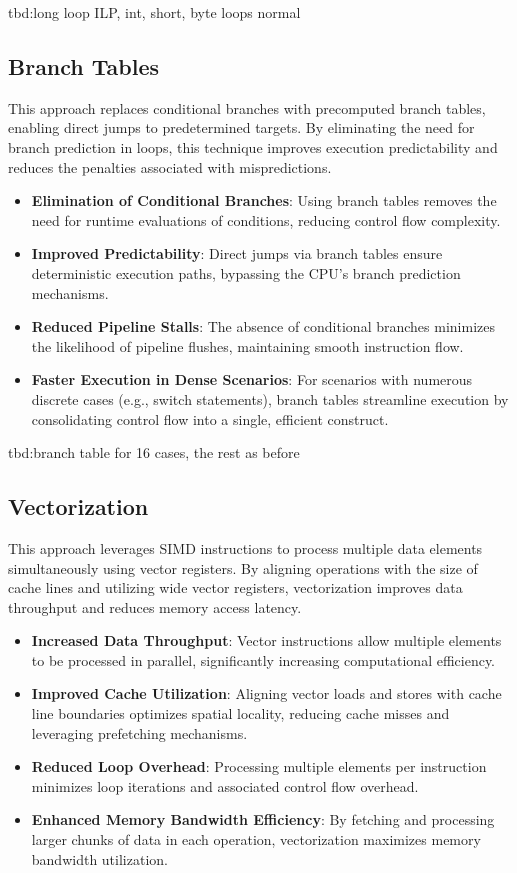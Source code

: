 \documentclass{article}
\begin{document}
tbd:long loop ILP, int, short, byte loops normal

\subsection{Branch Tables}

This approach replaces conditional branches with precomputed branch tables, enabling direct jumps to predetermined targets. By eliminating the need for branch prediction in loops, this technique improves execution predictability and reduces the penalties associated with mispredictions.

\begin{itemize}
  \item \textbf{Elimination of Conditional Branches}: Using branch tables removes the need for runtime evaluations of conditions, reducing control flow complexity.
  \item \textbf{Improved Predictability}: Direct jumps via branch tables ensure deterministic execution paths, bypassing the CPU's branch prediction mechanisms.
  \item \textbf{Reduced Pipeline Stalls}: The absence of conditional branches minimizes the likelihood of pipeline flushes, maintaining smooth instruction flow.
  \item \textbf{Faster Execution in Dense Scenarios}: For scenarios with numerous discrete cases (e.g., switch statements), branch tables streamline execution by consolidating control flow into a single, efficient construct.
\end{itemize}

tbd:branch table for 16 cases, the rest as before

\subsection{Vectorization}

This approach leverages SIMD instructions to process multiple data elements simultaneously using vector registers. By aligning operations with the size of cache lines and utilizing wide vector registers, vectorization improves data throughput and reduces memory access latency.

\begin{itemize}
  \item \textbf{Increased Data Throughput}: Vector instructions allow multiple elements to be processed in parallel, significantly increasing computational efficiency.
  \item \textbf{Improved Cache Utilization}: Aligning vector loads and stores with cache line boundaries optimizes spatial locality, reducing cache misses and leveraging prefetching mechanisms.
  \item \textbf{Reduced Loop Overhead}: Processing multiple elements per instruction minimizes loop iterations and associated control flow overhead.
  \item \textbf{Enhanced Memory Bandwidth Efficiency}: By fetching and processing larger chunks of data in each operation, vectorization maximizes memory bandwidth utilization.
\end{itemize}
\end{document}

